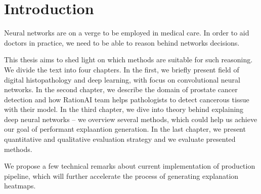 \chapter{Introduction}\label{chap:introduction}

Neural networks are on a verge to be employed in medical care. In order to aid doctors in practice, we need to be able to reason behind networks decisions.

This thesis aims to shed light on which methods are suitable for such reasoning. We divide the text into four chapters. In the first, we briefly present field of digital histopathology and deep learning, with focus on convolutional neural networks. In the second chapter, we describe the domain of prostate cancer detection and how RationAI team helps pathologists to detect cancerous tissue with their model. In the third chapter, we dive into theory behind explaining deep neural networks -- we overview several methods, which could help us achieve our goal of performant explaantion generation. In the last chapter, we present quantitative and qualitative evaluation strategy and we evaluate presented methods.

We propose a few technical remarks about current implementation of production pipeline, which will further accelerate the process of generating explanation heatmaps.